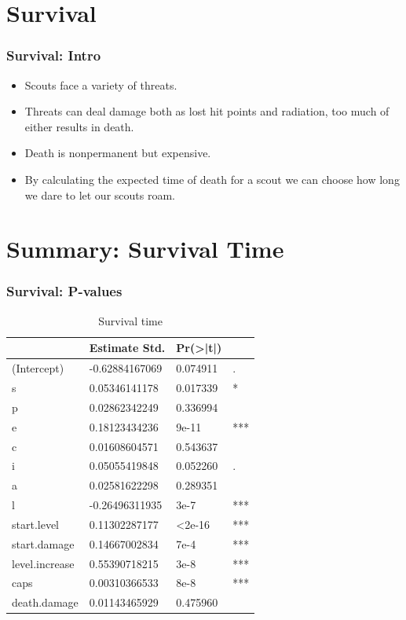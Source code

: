 \documentclass{beamer}
\begin{document}
\section{Survival}
\begin{frame}
  \frametitle{Survival: Intro}
  \begin{itemize}
  \item Scouts face a variety of threats.
  \item Threats can deal damage both as lost hit points and radiation, too much of either results in death.
  \item Death is nonpermanent but expensive.
  \item By calculating the expected time of death for a scout we can choose how long we dare to let our scouts roam.
  \end{itemize}
\end{frame}

\section{Summary: Survival Time}
\begin{frame}
  \frametitle{Survival: P-values}
\begin{table}[]
\centering
\caption{Survival time}
\label{table:survival.time}
\begin{tabular}{l|lll}
&Estimate Std.&Pr(>|t|)& \\ 
\hline
(Intercept)    & -0.62884167069  & 0.074911&. \\ 
s              & 0.05346141178    & 0.017339 &*\\
p              & 0.02862342249    & 0.336994 &\\
e              & 0.18123434236    & 9e-11&*** \\
c              & 0.01608604571    & 0.543637& \\
i              & 0.05055419848    & 0.052260& .\\
a              & 0.02581622298    & 0.289351& \\
l              & -0.26496311935  & 3e-7&*** \\
start.level    & 0.11302287177   & <2e-16&*** \\
start.damage   & 0.14667002834    & 7e-4&*** \\
level.increase & 0.55390718215    & 3e-8 &***\\
caps           & 0.00310366533    & 8e-8&*** \\
death.damage   & 0.01143465929    & 0.475960&\\
\hline
\end{tabular}
\end{table}
\end{frame}
\end{document}

